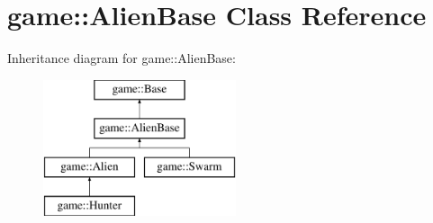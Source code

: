\hypertarget{classgame_1_1AlienBase}{}\section{game\+:\+:Alien\+Base Class Reference}
\label{classgame_1_1AlienBase}
Inheritance diagram for game\+:\+:Alien\+Base\+:\begin{figure}[H]
\begin{center}
\leavevmode
\includegraphics[height=4.000000cm]{classgame_1_1AlienBase}
\end{center}
\end{figure}
